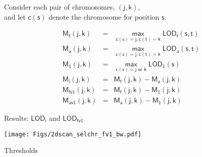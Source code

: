 \documentclass[12pt]{article}
\newcommand{\headsize}{\fontsize{35}{35} \selectfont}
\newcommand{\smallersize}{\fontsize{20}{25} \selectfont}
\newcommand{\lod}{\text{LOD}}
\newcommand{\M}{\text{M}}
\begin{document}
\hfill \begin{minipage}[t]{10in}
Consider each pair of chromosomes, {\color{myblue} $\mathsf{(j, k)}$}, \\
and let {\color{myblue} $\mathsf{c(s)}$} denote the chromosome for
  position {\color{myblue} $\mathsf{s}$}.

\vspace{5mm}

\hspace{1in}
\begin{minipage}{6in}
{\color{myblue}
\begin{eqnarray*}
\mathsf{\M_f(j,k)}& = &\mathsf{ \max_{c(s)=j, c(t)=k} \lod_f(s,t)} \\[12pt]
\mathsf{\M_a(j,k)}& = &\mathsf{ \max_{c(s)=j, c(t)=k} \lod_a(s,t)} \\[12pt]
\mathsf{\M_1(j,k)}& = &\mathsf{ \max_{c(s)=j \text{ or } k} \lod_1(s)} \\[36pt]
\mathsf{\M_i(j,k)}& = &\mathsf{ \M_f(j,k) - \M_a(j,k)}\\[12pt]
\mathsf{\M_{fv1}(j,k)}& = &\mathsf{ \M_f(j,k) - \M_1(j,k)}\\[12pt]
\mathsf{\M_{av1}(j,k)}& = &\mathsf{ \M_a(j,k) - \M_1(j,k)}
\end{eqnarray*}
}
\end{minipage}
\end{minipage}

\newpage

\headsize \color{myyellow}
\hfill \begin{minipage}{5.75in}
\centering
Results: $\mathsf{\lod_i}$ and $\mathsf{\lod_{fv1}}$
\end{minipage}

\vfill

\centerline{\texttt{[image: Figs/2dscan\_selchr\_fv1\_bw.pdf]}}



\newpage

\headsize \color{myyellow}
\hfill \begin{minipage}{5.75in}
\centering
Thresholds
\end{minipage}

\vspace{20mm}

\color{mywhite} \smallersize
\end{document}
